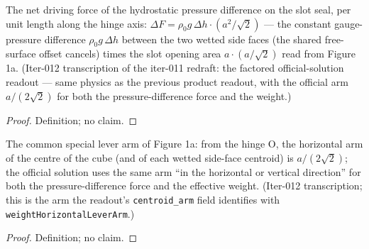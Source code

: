\begin{definition}
\label{def:IPhO2026Problems_problem_IPhO_2026_1_A_1:pressureDifferenceForce}
The net driving force of the hydrostatic pressure difference on the slot
seal, per unit length along the hinge axis:
$\Delta F = \rho_0 g\, \Delta h \cdot (a^2/\sqrt{2})$ --- the constant
gauge-pressure difference $\rho_0 g\, \Delta h$ between the two wetted
side faces (the shared free-surface offset cancels) times the slot
opening area $a \cdot (a/\sqrt{2})$ read from Figure 1a.  (Iter-012
transcription of the iter-011 redraft: the factored official-solution
readout --- same physics as the previous product readout, with the
official arm $a/(2\sqrt{2})$ for both the pressure-difference force and
the weight.)
\end{definition}
\begin{proof}
Definition; no claim.
\end{proof}

\begin{definition}
\label{def:IPhO2026Problems_problem_IPhO_2026_1_A_1:pressureFigureArm}
The common special lever arm of Figure 1a: from the hinge O, the
horizontal arm of the centre of the cube (and of each wetted side-face
centroid) is $a/(2\sqrt{2})$; the official solution uses the same arm
``in the horizontal or vertical direction'' for both the
pressure-difference force and the effective weight.  (Iter-012
transcription; this is the arm the readout's \texttt{centroid\_arm} field
identifies with \texttt{weightHorizontalLeverArm}.)
\end{definition}
\begin{proof}
Definition; no claim.
\end{proof}


